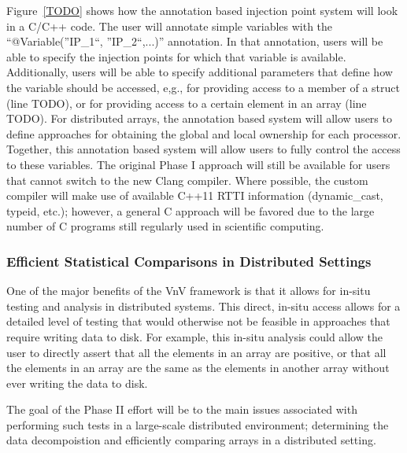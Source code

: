 Figure~\ref{TODO} shows how the annotation based injection point system will look in a C/C++ code. The user will annotate simple variables with the ``@Variable(''IP\_1``, ''IP\_2``,...)'' annotation. In that annotation, users will be able to specify the injection points for which that variable is available. Additionally, users will be able to specify additional parameters that define how the variable should be accessed, e,g., for providing access to a member of a struct (line TODO), or for providing access to a certain element in an array (line TODO). For distributed arrays, the annotation based system will allow users to define approaches for obtaining the global and local ownership for each processor. Together, this annotation based system will allow users to fully control the access to these variables. The original Phase I approach will still be available for users that cannot switch to the new Clang compiler. Where possible, the custom compiler will make use of available C++11 RTTI information (dynamic\_cast, typeid, etc.); however, a general C approach will be favored due to the large number of C programs still regularly used in scientific computing. 


\subsubsection{Efficient Statistical Comparisons in Distributed Settings} 

One of the major benefits of the VnV framework is that it allows for in-situ testing and analysis in distributed systems. This direct, in-situ access allows for a detailed level of testing that would otherwise not be feasible in \VV approaches that require writing data to disk. For example, this in-situ analysis could allow the user to directly assert that all the elements in an array are positive, or that all the elements in an array are the same as the elements in another array without ever writing the data to disk. 

The goal of the Phase II effort will be to the main issues associated with performing such tests in a large-scale distributed environment; determining the data decompoistion and efficiently comparing arrays in a distributed setting.

